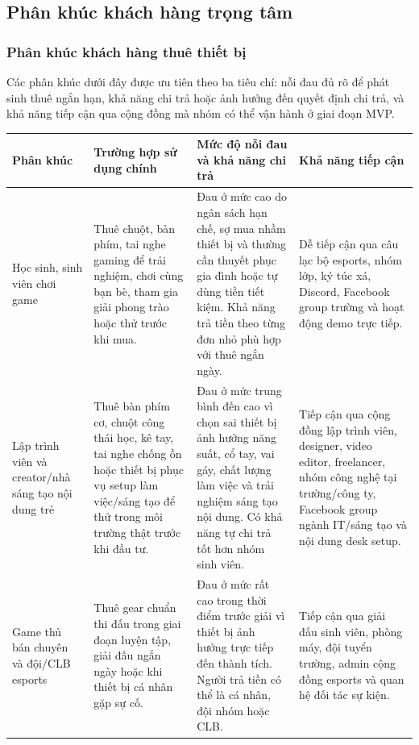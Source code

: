 \subsection{Phân khúc khách hàng trọng tâm}

\subsubsection{Phân khúc khách hàng thuê thiết bị}

Các phân khúc dưới đây được ưu tiên theo ba tiêu chí: nỗi đau đủ rõ để phát sinh thuê ngắn hạn, khả năng chi trả hoặc ảnh hưởng đến quyết định chi trả, và khả năng tiếp cận qua cộng đồng mà nhóm có thể vận hành ở giai đoạn MVP.


\begin{longtable}{@{}p{}p{}p{}p{}@{}}
\toprule
\textbf{Phân khúc} & \textbf{Trường hợp sử dụng chính} & \textbf{Mức độ nỗi đau và khả năng chi trả} & \textbf{Khả năng tiếp cận} \\
\midrule
\endhead
Học sinh, sinh viên chơi game & Thuê chuột, bàn phím, tai nghe gaming để trải nghiệm, chơi cùng bạn bè, tham gia giải phong trào hoặc thử trước khi mua. & Đau ở mức cao do ngân sách hạn chế, sợ mua nhầm thiết bị và thường cần thuyết phục gia đình hoặc tự dùng tiền tiết kiệm. Khả năng trả tiền theo từng đơn nhỏ phù hợp với thuê ngắn ngày. & Dễ tiếp cận qua câu lạc bộ esports, nhóm lớp, ký túc xá, Discord, Facebook group trường và hoạt động demo trực tiếp. \\
Lập trình viên và creator/nhà sáng tạo nội dung trẻ & Thuê bàn phím cơ, chuột công thái học, kê tay, tai nghe chống ồn hoặc thiết bị phục vụ setup làm việc/sáng tạo để thử trong môi trường thật trước khi đầu tư. & Đau ở mức trung bình đến cao vì chọn sai thiết bị ảnh hưởng năng suất, cổ tay, vai gáy, chất lượng làm việc và trải nghiệm sáng tạo nội dung. Có khả năng tự chi trả tốt hơn nhóm sinh viên. & Tiếp cận qua cộng đồng lập trình viên, designer, video editor, freelancer, nhóm công nghệ tại trường/công ty, Facebook group ngành IT/sáng tạo và nội dung desk setup. \\
Game thủ bán chuyên và đội/CLB esports & Thuê gear chuẩn thi đấu trong giai đoạn luyện tập, giải đấu ngắn ngày hoặc khi thiết bị cá nhân gặp sự cố. & Đau ở mức rất cao trong thời điểm trước giải vì thiết bị ảnh hưởng trực tiếp đến thành tích. Người trả tiền có thể là cá nhân, đội nhóm hoặc CLB. & Tiếp cận qua giải đấu sinh viên, phòng máy, đội tuyển trường, admin cộng đồng esports và quan hệ đối tác sự kiện. \\
\bottomrule
\end{longtable}

